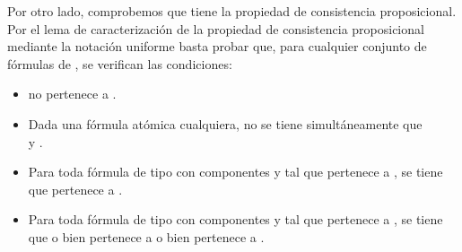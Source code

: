 \begin{isabellebody}
\begin{isamarkuptext}
\begin{demostracion}
  Por otro lado, comprobemos que  tiene la propiedad de consistencia proposicional.
  Por el lema de caracterización de la propiedad de consistencia proposicional mediante la
  notación uniforme basta probar que, para cualquier conjunto de fórmulas  de , se 
  verifican las condiciones:
  \begin{itemize}
    \item \isa{{\isasymbottom}} no pertenece a .
    \item Dada  una fórmula atómica cualquiera, no se tiene 
    simultáneamente que\\  y .
    \item Para toda fórmula de tipo \isa{{\isasymalpha}} con componentes  y  tal que \isa{{\isasymalpha}}
    pertenece a , se tiene que  pertenece a .
    \item Para toda fórmula de tipo \isa{{\isasymbeta}} con componentes  y  tal que \isa{{\isasymbeta}}
    pertenece a , se tiene que o bien  pertenece a  o 
    bien  pertenece a .
  \end{itemize} 


\end{demostracion}
\end{isamarkuptext}
\end{isabellebody}
